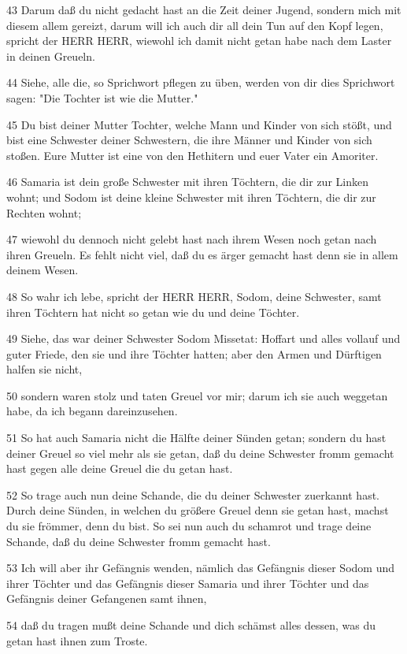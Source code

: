 \par 43 Darum daß du nicht gedacht hast an die Zeit deiner Jugend, sondern mich mit diesem allem gereizt, darum will ich auch dir all dein Tun auf den Kopf legen, spricht der HERR HERR, wiewohl ich damit nicht getan habe nach dem Laster in deinen Greueln.
\par 44 Siehe, alle die, so Sprichwort pflegen zu üben, werden von dir dies Sprichwort sagen: "Die Tochter ist wie die Mutter."
\par 45 Du bist deiner Mutter Tochter, welche Mann und Kinder von sich stößt, und bist eine Schwester deiner Schwestern, die ihre Männer und Kinder von sich stoßen. Eure Mutter ist eine von den Hethitern und euer Vater ein Amoriter.
\par 46 Samaria ist dein große Schwester mit ihren Töchtern, die dir zur Linken wohnt; und Sodom ist deine kleine Schwester mit ihren Töchtern, die dir zur Rechten wohnt;
\par 47 wiewohl du dennoch nicht gelebt hast nach ihrem Wesen noch getan nach ihren Greueln. Es fehlt nicht viel, daß du es ärger gemacht hast denn sie in allem deinem Wesen.
\par 48 So wahr ich lebe, spricht der HERR HERR, Sodom, deine Schwester, samt ihren Töchtern hat nicht so getan wie du und deine Töchter.
\par 49 Siehe, das war deiner Schwester Sodom Missetat: Hoffart und alles vollauf und guter Friede, den sie und ihre Töchter hatten; aber den Armen und Dürftigen halfen sie nicht,
\par 50 sondern waren stolz und taten Greuel vor mir; darum ich sie auch weggetan habe, da ich begann dareinzusehen.
\par 51 So hat auch Samaria nicht die Hälfte deiner Sünden getan; sondern du hast deiner Greuel so viel mehr als sie getan, daß du deine Schwester fromm gemacht hast gegen alle deine Greuel die du getan hast.
\par 52 So trage auch nun deine Schande, die du deiner Schwester zuerkannt hast. Durch deine Sünden, in welchen du größere Greuel denn sie getan hast, machst du sie frömmer, denn du bist. So sei nun auch du schamrot und trage deine Schande, daß du deine Schwester fromm gemacht hast.
\par 53 Ich will aber ihr Gefängnis wenden, nämlich das Gefängnis dieser Sodom und ihrer Töchter und das Gefängnis dieser Samaria und ihrer Töchter und das Gefängnis deiner Gefangenen samt ihnen,
\par 54 daß du tragen mußt deine Schande und dich schämst alles dessen, was du getan hast ihnen zum Troste.
